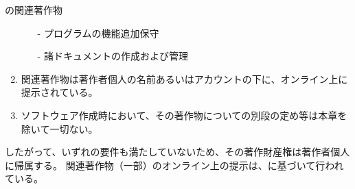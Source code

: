\begin{Column}{\DMname の関連著作物}
\begin{enumerate}[label=\Roman*]
\begin{enumerate}
  \item[-] プログラムの機能追加保守
  \item[-] 諸ドキュメントの作成および管理
  \end{enumerate}
\item 関連著作物は著作者個人の名前あるいはアカウントの下に、オンライン上に提示されている。
\item ソフトウェア作成時において、その著作物についての別段の定め等は本章を除いて一切ない。
\end{enumerate}
したがって、いずれの要件も満たしていないため、その著作財産権は著作者個人に帰属する。
関連著作物（一部）のオンライン上の提示は、に基づいて行われている。
\end{Column}


